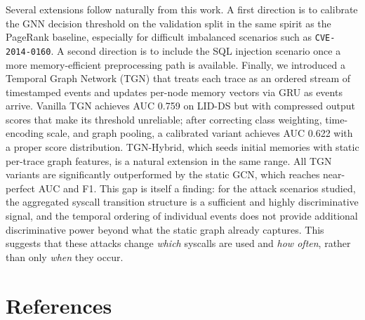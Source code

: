 \documentclass{article}
\begin{document}
Several extensions follow naturally from this work. A first direction is to calibrate the GNN decision threshold on the validation split in the same spirit as the PageRank baseline, especially for difficult imbalanced scenarios such as \texttt{CVE-2014-0160}. A second direction is to include the SQL injection scenario once a more memory-efficient preprocessing path is available. Finally, we introduced a Temporal Graph Network (TGN) that treats each trace as an ordered stream of timestamped events and updates per-node memory vectors via GRU as events arrive. Vanilla TGN achieves AUC 0.759 on LID-DS but with compressed output scores that make its threshold unreliable; after correcting class weighting, time-encoding scale, and graph pooling, a calibrated variant achieves AUC 0.622 with a proper score distribution. TGN-Hybrid, which seeds initial memories with static per-trace graph features, is a natural extension in the same range. All TGN variants are significantly outperformed by the static GCN, which reaches near-perfect AUC and F1. This gap is itself a finding: for the attack scenarios studied, the aggregated syscall transition structure is a sufficient and highly discriminative signal, and the temporal ordering of individual events does not provide additional discriminative power beyond what the static graph already captures. This suggests that these attacks change \emph{which} syscalls are used and \emph{how often}, rather than only \emph{when} they occur.


\section{References}



\end{document}
